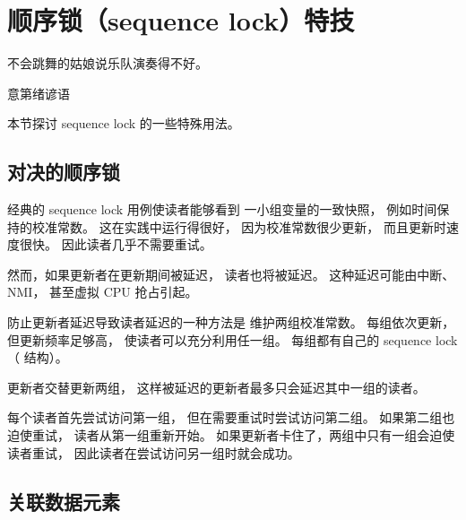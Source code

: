 
\section{顺序锁（sequence lock）特技}
\label{sec:together:Sequence-Locking Specials}
%
\epigraph{不会跳舞的姑娘说乐队演奏得不好。}
	 {意第绪谚语}

本节探讨 sequence lock 的一些特殊用法。

\subsection{对决的顺序锁}
\label{sec:together:Dueling Sequence Locks}

经典的 sequence lock 用例使读者能够看到
一小组变量的一致快照，
例如时间保持的校准常数。
这在实践中运行得很好，
因为校准常数很少更新，
而且更新时速度很快。
因此读者几乎不需要重试。

然而，如果更新者在更新期间被延迟，
读者也将被延迟。
这种延迟可能由中断、NMI，
甚至虚拟 CPU 抢占引起。

防止更新者延迟导致读者延迟的一种方法是
维护两组校准常数。
每组依次更新，但更新频率足够高，
使读者可以充分利用任一组。
每组都有自己的 sequence lock（ 结构）。

更新者交替更新两组，
这样被延迟的更新者最多只会延迟其中一组的读者。

每个读者首先尝试访问第一组，
但在需要重试时尝试访问第二组。
如果第二组也迫使重试，
读者从第一组重新开始。
如果更新者卡住了，两组中只有一组会迫使读者重试，
因此读者在尝试访问另一组时就会成功。

\QuickQuizEnd

\subsection{关联数据元素}
\label{sec:together:Correlated Data Elements}

